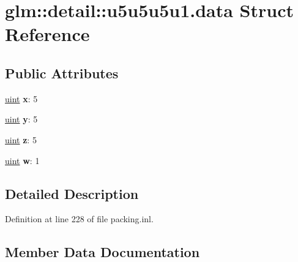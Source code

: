 \hypertarget{structglm_1_1detail_1_1u5u5u5u1_8data}{}\section{glm\+:\+:detail\+:\+:u5u5u5u1.\+data Struct Reference}
\label{structglm_1_1detail_1_1u5u5u5u1_8data}
\subsection*{Public Attributes}
\begin{DoxyCompactItemize}
\item 
\mbox{\label{structglm_1_1detail_1_1u5u5u5u1_8data_a9dd4e461268c8034f5c8564e155c67a6}} 
\hyperlink{group__core__precision_ga4fd29415871152bfb5abd588334147c8}{uint} {\bfseries x}\+: 5
\item 
\mbox{\label{structglm_1_1detail_1_1u5u5u5u1_8data_a415290769594460e2e485922904f345d}} 
\hyperlink{group__core__precision_ga4fd29415871152bfb5abd588334147c8}{uint} {\bfseries y}\+: 5
\item 
\mbox{\label{structglm_1_1detail_1_1u5u5u5u1_8data_afbade9e36a3f36d3d676c1b808451dd7}} 
\hyperlink{group__core__precision_ga4fd29415871152bfb5abd588334147c8}{uint} {\bfseries z}\+: 5
\item 
\mbox{\label{structglm_1_1detail_1_1u5u5u5u1_8data_af1290186a5d0b1ceab27f4e77c0c5d68}} 
\hyperlink{group__core__precision_ga4fd29415871152bfb5abd588334147c8}{uint} {\bfseries w}\+: 1
\end{DoxyCompactItemize}


\subsection{Detailed Description}


Definition at line 228 of file packing.\+inl.



\subsection{Member Data Documentation}
\mbox{\label{structglm_1_1detail_1_1u5u5u5u1_8data_af1290186a5d0b1ceab27f4e77c0c5d68}} 
